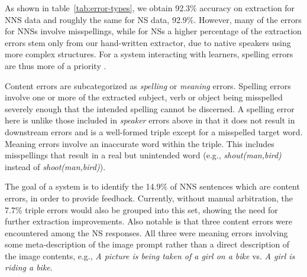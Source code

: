 As shown in table~\ref{tab:error-types}, we obtain 92.3\% accuracy on
extraction for NNS data and roughly the same for NS data, 92.9\%.
However, many of the errors for NNSs involve misspellings, while for
NSs a higher percentage of the extraction errors stem only from our
hand-written extractor, due to native speakers using more complex
structures.  For a system interacting with learners, spelling errors
are thus more of a priority \citep[cf.][]{hovermale:08}.

Content errors are subcategorized as \textit{spelling} or
\textit{meaning} errors. Spelling errors involve one or more of the
extracted subject, verb or object being misspelled severely enough
that the intended spelling cannot be discerned. A spelling error here
is unlike those included in \textit{speaker} errors above in that it
does not result in downstream errors and is a well-formed triple
except for a misspelled target word. Meaning errors involve an
inaccurate word within the triple.
This includes misspellings that result in a real but unintended word
(e.g., \textit{shout(man,bird)} instead of \textit{shoot(man,bird)}).

The goal of a system is to identify the 14.9\% of NNS sentences
which are content errors, in order to provide feedback.  Currently, without manual arbitration,
the 7.7\% triple errors would also be grouped into this set, showing
the need for further extraction improvements.  Also notable is that
three content errors were encountered among the NS responses. All
three were meaning errors involving some meta-description of the image
prompt rather than a direct description of the image contents, e.g.,
\textit{A picture is being taken of a girl on a bike} vs. \textit{A
  girl is riding a bike}.

